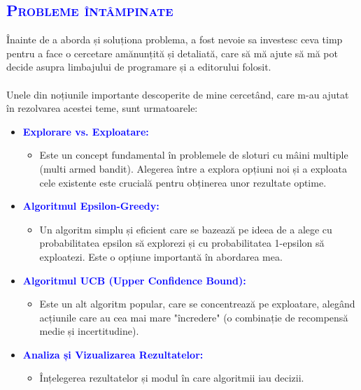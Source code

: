 \documentclass{article}
\begin{document}
\newpage
\begin{center}
	\textcolor{blue}{\section{\bfseries\scshape\textcolor{blue}{Probleme întâmpinate}}}
\end{center}
Înainte de a aborda și soluționa problema, a fost nevoie sa investesc ceva timp pentru a face o cercetare amănunțită și detaliată, care să mă ajute să mă pot decide asupra limbajului de programare și a editorului folosit.\\\\
Unele din noțiunile importante descoperite de mine cercetând, care m-au ajutat în rezolvarea acestei teme, sunt urmatoarele:

\begin{itemize}
\item\textbf{\textcolor{blue}{Explorare vs. Exploatare: }} 
\begin{itemize}
      \item  Este un concept fundamental în problemele de sloturi cu mâini multiple (multi armed bandit). Alegerea între a explora opțiuni noi și a exploata cele existente este crucială pentru obținerea unor rezultate optime.
\end{itemize}
\end{itemize}
\begin{itemize}
\item\textbf{\textcolor{blue}{Algoritmul Epsilon-Greedy:}} 
\begin{itemize}
      \item  Un algoritm simplu și eficient care se bazează pe ideea de a alege cu probabilitatea epsilon să explorezi și cu probabilitatea 1-epsilon să exploatezi. Este o opțiune importantă în abordarea mea.
\end{itemize}
\end{itemize}
\begin{itemize}
\item\textbf{\textcolor{blue}{Algoritmul UCB (Upper Confidence Bound):}} 
\begin{itemize}
      \item  Este un alt algoritm popular, care se concentrează pe exploatare, alegând acțiunile care au cea mai mare "încredere" (o combinație de recompensă medie și incertitudine).
\end{itemize}
\end{itemize}
\begin{itemize}
\item\textbf{\textcolor{blue}{Analiza și Vizualizarea Rezultatelor: }} 
\begin{itemize}
      \item  Înțelegerea rezultatelor și modul în care algoritmii iau decizii.
\end{itemize}
\end{itemize}
\end{document}
